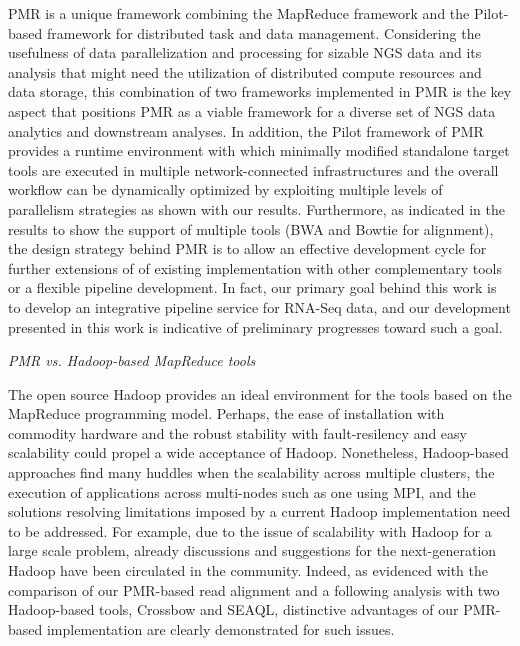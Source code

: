 \documentclass{sig-alternate}
\begin{document}
{PMR is a unique framework combining the MapReduce framework and the Pilot-based framework for distributed task and data management\cite{pmr2012}.  Considering the usefulness of data parallelization and processing for sizable NGS data and its analysis that might need the utilization of distributed compute resources and data storage, this combination of two frameworks implemented in PMR is the key aspect that positions PMR as a viable framework for a diverse set of NGS data analytics and downstream analyses.  In addition, the Pilot framework of PMR provides a runtime environment with which minimally modified standalone target tools are executed in multiple network-connected infrastructures and the overall workflow can be dynamically optimized by exploiting multiple levels of parallelism strategies as shown with our results.    Furthermore, as indicated in the results to show the support of multiple tools (BWA and Bowtie for alignment), the design strategy behind PMR is to allow an effective development cycle for further extensions of of existing implementation with other complementary tools or a flexible pipeline development.  In fact, our primary goal behind this work is to develop an integrative pipeline service for RNA-Seq data, and our development presented in this work is indicative of preliminary progresses toward such a goal. 

\textit{PMR vs. Hadoop-based MapReduce tools}

The open source Hadoop provides an ideal environment for the tools
based on the MapReduce programming model.  Perhaps, the ease of
installation with commodity hardware and the robust stability with
fault-resilency and easy scalability could propel a wide acceptance of
Hadoop.  Nonetheless, Hadoop-based approaches find many huddles when
the scalability across multiple clusters\cite{weissman-mr-11}, the
execution of applications across multi-nodes such as one using MPI,
and the solutions resolving limitations imposed by a current Hadoop
implementation need to be addressed.  For example, due to the issue of
scalability with Hadoop for a large scale problem, already discussions
and suggestions for the next-generation Hadoop have been circulated in
the community\cite{ng-hadoop-url}.  Indeed, as evidenced with the
comparison of our PMR-based read alignment and a following analysis
with two Hadoop-based tools, Crossbow and SEAQL, distinctive
advantages of our PMR-based implementation are clearly demonstrated
for such issues.

}
\end{document}
